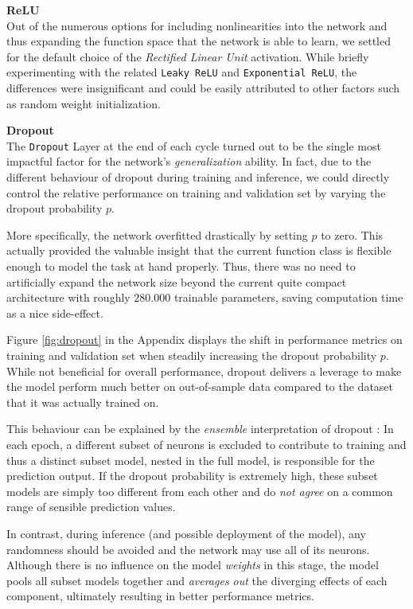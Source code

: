 \documentclass[12pt, letterpaper]{article}
\begin{document}
\textbf{ReLU} \\
Out of the numerous options for including nonlinearities into the network and thus expanding the function space that the network is able to learn, we settled for the default choice of the \emph{Rectified Linear Unit} activation.
While briefly experimenting with the related \texttt{Leaky ReLU} and \texttt{Exponential ReLU}, the differences were insignificant and could be easily attributed to other factors such as random weight initialization.

\textbf{Dropout} \\
The \texttt{Dropout} Layer \cite{srivastava2014} at the end of each cycle turned out to be the single most impactful factor for the network's \emph{generalization} ability.
In fact, due to the different behaviour of dropout during training and inference, we could directly control the relative performance on training and validation set by varying the dropout probability $p$.

More specifically, the network overfitted drastically by setting $p$ to zero.
This actually provided the valuable insight that the current function class is flexible enough to model the task at hand properly.
Thus, there was no need to artificially expand the network size beyond the current quite compact architecture with roughly $280.000$ trainable parameters, saving computation time as a nice side-effect.

Figure \ref{fig:dropout} in the Appendix displays the shift in performance metrics on training and validation set when steadily increasing the dropout probability $p$.
While not beneficial for overall performance, dropout delivers a leverage to make the model perform much better on out-of-sample data compared to the dataset that it was actually trained on.

This behaviour can be explained by the \emph{ensemble} interpretation of dropout \cite{goodfellow2016}:
In each epoch, a different subset of neurons is excluded to contribute to training and thus a distinct subset model, nested in the full model, is responsible for the prediction output.
If the dropout probability is extremely high, these subset models are simply too different from each other and do \emph{not agree} on a common range of sensible prediction values.

In contrast, during inference (and possible deployment of the model), any randomness should be avoided and the network may use all of its neurons.
Although there is no influence on the model \emph{weights} in this stage, the model pools all subset models together and \emph{averages out} the diverging effects of each component, ultimately resulting in better performance metrics.
\end{document}
